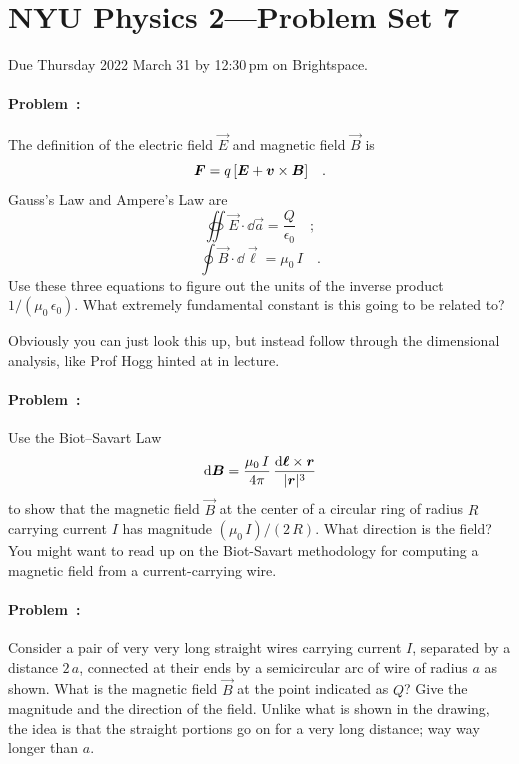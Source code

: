\documentclass[12pt]{article}
\begin{document}
\section*{NYU Physics 2---Problem Set 7}

Due Thursday 2022 March 31 by 12:30\,pm on Brightspace.

\paragraph{Problem~\theproblem:}%
The definition of the electric field $\vec{E}$ and magnetic field
$\vec{B}$ is
\begin{equation}
  \boldsymbol{F} = q\,[\boldsymbol{E} + \boldsymbol{v}\times\boldsymbol{B}]
  \quad .
\end{equation}
Gauss's Law and Ampere's Law are
\begin{equation}
  \oiint\vec{E}\cdot\dd\vec{a} = \frac{Q}{\epsilon_0}
  \quad ;
\end{equation}
\begin{equation}
  \oint\vec{B}\cdot\dd\vec{\ell} = \mu_0\,I
  \quad .
\end{equation}
Use these three equations to figure out the units of the inverse
product $1/(\mu_0\,\epsilon_0)$. What extremely fundamental constant
is this going to be related to?

Obviously you can just look this up, but instead follow through the dimensional analysis,
like Prof Hogg hinted at in lecture.

\paragraph{Problem~\theproblem:}%
Use the Biot--Savart Law
\begin{equation}
  \mathrm{d}\boldsymbol{B} = \frac{\mu_0\,I}{4\pi}\,\frac{\mathrm{d}\boldsymbol{\ell}\times\boldsymbol{r}}{|\boldsymbol{r}|^3}
\end{equation}
to show that the magnetic field $\vec{B}$ at the center of a circular
ring of radius $R$ carrying current $I$ has magnitude
$(\mu_0\,I)/(2\,R)$. What direction is the field? You might want to
read up on the Biot-Savart methodology for computing a magnetic field
from a current-carrying wire.

\paragraph{Problem~\theproblem:}%
Consider a pair of very very long straight wires carrying current $I$,
separated by a distance $2\,a$, connected at their ends by a
semicircular arc of wire of radius $a$ as shown. What is the magnetic
field $\vec{B}$ at the point indicated as $Q$? Give the magnitude and
the direction of the field. Unlike what is shown in the drawing,
the idea is that the straight portions go on for a very long distance;
way way longer than $a$.
\end{document}
